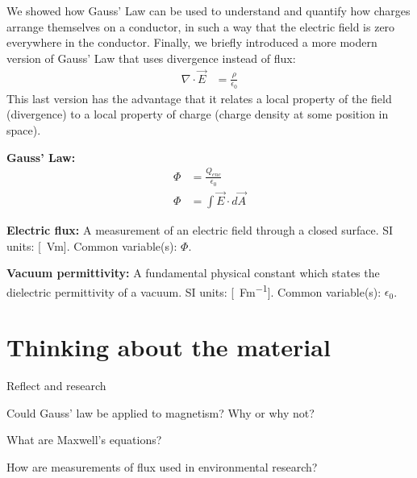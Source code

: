 \begin{chapterSummary}
\begin{enumerate}
\end{enumerate}
We showed how Gauss' Law can be used to understand and quantify how charges arrange themselves on a conductor, in such a way that the electric field is zero everywhere in the conductor. Finally, we briefly introduced a more modern version of Gauss' Law that uses divergence instead of flux:
\begin{align*}
\nabla \cdot \vec E &= \frac{\rho}{\epsilon_0}
\end{align*}
This last version has the advantage that it relates a local property of the field (divergence) to a local property of charge (charge density at some position in space). 




\end{chapterSummary}

\newpage
\begin{importantEquations}
\medskip
\begin{multicols}{2}
\textbf{Gauss' Law:}
\begin{align*}
\Phi & = \frac{Q_{enc}}{\epsilon_0}\\
\Phi &= \int \vec E \cdot d \vec A
\end{align*}
\columnbreak

\end{multicols}
\end{importantEquations}


\begin{definitions}
	\textbf{Electric flux:} A measurement of an electric field through a closed surface. SI units: [\SI{}{Vm}]. Common variable(s): $\Phi$.
	\medskip
	\item \textbf{Vacuum permittivity:} A fundamental physical constant which states the dielectric permittivity of a vacuum. SI units: [\SI{}{Fm^{-1}}]. Common variable(s): $\epsilon_0$.

\end{definitions}


\newpage
\section{Thinking about the material}

\begin{chapteractivity}{Reflect and research}
{
\item Could Gauss' law be applied to magnetism? Why or why not?
\item What are Maxwell's equations? 
\item How are measurements of flux used in environmental research?
}
\end{chapteractivity}

